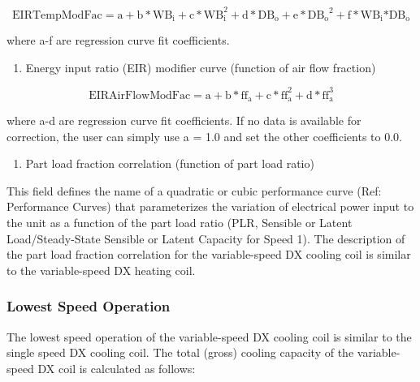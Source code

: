 \begin{equation}
{\mathrm{EIRTempModFac}} = {\mathrm{a}} + {\mathrm{b*W}}{{\mathrm{B}}_{\mathrm{i}}} + {\mathrm{c*WB}}_{\mathrm{i}}^2 + {\mathrm{d*D}}{{\mathrm{B}}_{\mathrm{o}}} + {\mathrm{e*D}}{{\mathrm{B}}_{\mathrm{o}}}^2 + {\mathrm{f*W}}{{\mathrm{B}}_{\mathrm{i}}}{\mathrm{*D}}{{\mathrm{B}}_{\mathrm{o}}}
\end{equation}

where a-f are regression curve fit coefficients.

\begin{enumerate}
\def\labelenumi{\arabic{enumi})}
\setcounter{enumi}{3}
\tightlist
\item
  Energy input ratio (EIR) modifier curve (function of air flow fraction)
\end{enumerate}

\begin{equation}
{\mathrm{EIRAirFlowModFac}} = {\mathrm{a}} + {\mathrm{b*f}}{{\mathrm{f}}_{\mathrm{a}}} + {\mathrm{c*ff}}_{\mathrm{a}}^2 + {\mathrm{d*ff}}_{\mathrm{a}}^3
\end{equation}

where a-d are regression curve fit coefficients.  If no data is available for correction, the user can simply use a = 1.0 and set the other coefficients to 0.0.

\begin{enumerate}
\def\labelenumi{\arabic{enumi})}
\setcounter{enumi}{4}
\tightlist
\item
  Part load fraction correlation (function of part load ratio)
\end{enumerate}

This field defines the name of a quadratic or cubic performance curve (Ref: Performance Curves) that parameterizes the variation of electrical power input to the unit as a function of the part load ratio (PLR, Sensible or Latent Load/Steady-State Sensible or Latent Capacity for Speed 1). The description of the part load fraction correlation for the variable-speed DX cooling coil is similar to the variable-speed DX heating coil.

\subsubsection{Lowest Speed Operation}\label{lowest-speed-operation}

The lowest speed operation of the variable-speed DX cooling coil is similar to the single speed DX cooling coil. The total (gross) cooling capacity of the variable-speed DX coil is calculated as follows:

